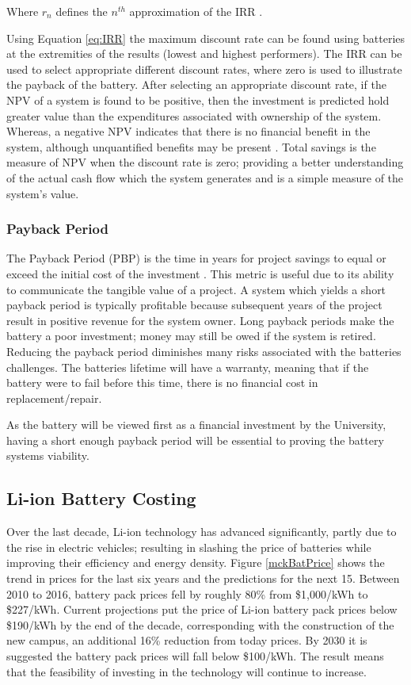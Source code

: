 Where \(r_{ n }\) defines the \(n^{th}\) approximation of the IRR
\cite{xxxdvi44:online}.

Using Equation \ref{eq:IRR} the maximum discount rate can be found using
batteries at the extremities of the results (lowest and highest
performers). The IRR can be used to select appropriate different
discount rates, where zero is used to illustrate the payback of the
battery. After selecting an appropriate discount rate, if the NPV of a
system is found to be positive, then the investment is predicted hold
greater value than the expenditures associated with ownership of the
system. Whereas, a negative NPV indicates that there is no financial
benefit in the system, although unquantified benefits may be present
\cite{diorio2015economic}. Total savings is the measure of NPV when the
discount rate is zero; providing a better understanding of the actual
cash flow which the system generates and is a simple measure of the
system's value.

\subsubsection{Payback Period}\label{payback-period}

The Payback Period (PBP) is the time in years for project savings to
equal or exceed the initial cost of the investment
\cite{diorio2015economic}. This metric is useful due to its ability to
communicate the tangible value of a project. A system which yields a
short payback period is typically profitable because subsequent years of
the project result in positive revenue for the system owner. Long
payback periods make the battery a poor investment; money may still be
owed if the system is retired. Reducing the payback period diminishes
many risks associated with the batteries challenges. The batteries
lifetime will have a warranty, meaning that if the battery were to fail
before this time, there is no financial cost in replacement/repair.

As the battery will be viewed first as a financial investment by the
University, having a short enough payback period will be essential to
proving the battery systems viability.

\subsection{Li-ion Battery Costing}\label{li-ion-battery-costing}

Over the last decade, Li-ion technology has advanced significantly,
partly due to the rise in electric vehicles; resulting in slashing the
price of batteries while improving their efficiency and energy density.
Figure \ref{mckBatPrice} shows the trend in prices for the last six
years and the predictions for the next 15. Between 2010 to 2016, battery
pack prices fell by roughly 80\% from \$1,000/kWh to \$227/kWh. Current
projections put the price of Li-ion battery pack prices below \$190/kWh
by the end of the decade, corresponding with the construction of the new
campus, an additional 16\% reduction from today prices. By 2030 it is
suggested the battery pack prices will fall below \$100/kWh. The result
means that the feasibility of investing in the technology will continue
to increase.

